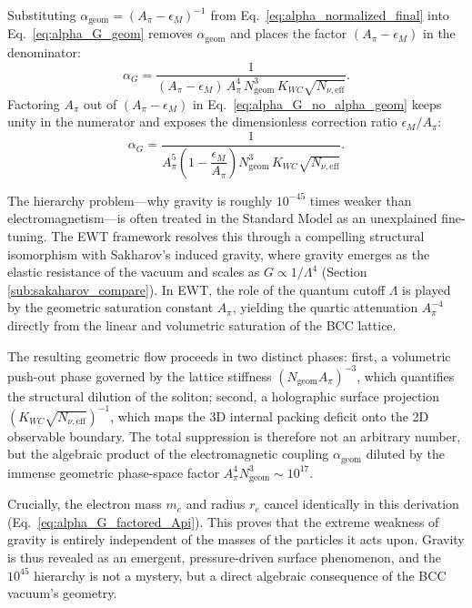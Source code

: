 \documentclass[10pt,a4paper]{article}
\begin{document}
Substituting \(\alpha_{\text{geom}} = (A_\pi - \epsilon_M)^{-1}\) from Eq.~\eqref{eq:alpha_normalized_final} into Eq.~\eqref{eq:alpha_G_geom} removes \(\alpha_{\text{geom}}\) and places the factor \((A_\pi - \epsilon_M)\) in the denominator:
\begin{equation}
	\alpha_G
	= \frac{1}{(A_\pi - \epsilon_M)\, A_\pi^4 \, N_{\text{geom}}^3 \, K_{WC} \sqrt{N_{\nu,\text{eff}}}}.
	\label{eq:alpha_G_no_alpha_geom}
\end{equation}
Factoring \(A_\pi\) out of \((A_\pi - \epsilon_M)\) in Eq.~\eqref{eq:alpha_G_no_alpha_geom} keeps unity in the numerator and exposes the dimensionless correction ratio \(\epsilon_M / A_\pi\):
\begin{equation}
	\alpha_G
	= \frac{1}{A_\pi^5 \left(1 - \dfrac{\epsilon_M}{A_\pi}\right) N_{\text{geom}}^3 \, K_{WC} \sqrt{N_{\nu,\text{eff}}}}.
	\label{eq:alpha_G_factored_Api}
\end{equation}

The hierarchy problem---why gravity is roughly \(10^{-45}\) times weaker than electromagnetism---is often treated in the Standard Model as an unexplained fine-tuning. The EWT framework resolves this through a compelling structural isomorphism with Sakharov's induced gravity, where gravity emerges as the elastic resistance of the vacuum and scales as \(G \propto 1/\Lambda^4\) \cite{sakharov1968}(Section \ref{sub:sakaharov_compare}). In EWT, the role of the quantum cutoff \(\Lambda\) is played by the geometric saturation constant \(A_\pi\), yielding the quartic attenuation \(A_\pi^{-4}\) directly from the linear and volumetric saturation of the BCC lattice. 

The resulting geometric flow proceeds in two distinct phases: first, a volumetric push-out phase governed by the lattice stiffness \((N_{\text{geom}} A_\pi)^{-3}\), which quantifies the structural dilution of the soliton; second, a holographic surface projection \((K_{WC} \sqrt{N_{\nu,\text{eff}}})^{-1}\), which maps the 3D internal packing deficit onto the 2D observable boundary. The total suppression is therefore not an arbitrary number, but the algebraic product of the electromagnetic coupling \(\alpha_{\text{geom}}\) diluted by the immense geometric phase-space factor \(A_\pi^4 N_{\text{geom}}^3 \sim 10^{17}\). 

Crucially, the electron mass \(m_e\) and radius \(r_e\) cancel identically in this derivation (Eq.~\eqref{eq:alpha_G_factored_Api}). This proves that the extreme weakness of gravity is entirely independent of the masses of the particles it acts upon. Gravity is thus revealed as an emergent, pressure-driven surface phenomenon, and the \(10^{45}\) hierarchy is not a mystery, but a direct algebraic consequence of the BCC vacuum's geometry.
\end{document}
